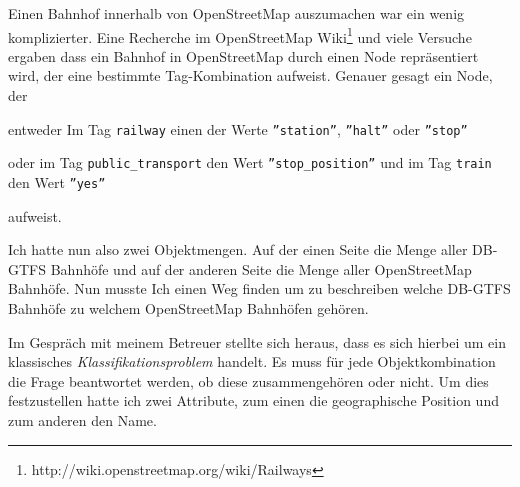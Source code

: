Einen Bahnhof innerhalb von OpenStreetMap auszumachen war ein wenig komplizierter.
Eine Recherche im OpenStreetMap Wiki\footnote{http://wiki.openstreetmap.org/wiki/Railways} und viele Versuche ergaben dass ein Bahnhof in OpenStreetMap durch einen Node repräsentiert wird, der eine bestimmte Tag-Kombination aufweist.
Genauer gesagt ein Node, der 
\begin{compactitem}
  \item entweder Im Tag \texttt{railway} einen der Werte \texttt{''station''}, \texttt{''halt''} oder \texttt{''stop''}
  \item oder im Tag \texttt{public\_transport} den Wert \texttt{''stop\_position''} und im Tag \texttt{train} den Wert \texttt{''yes''}
\end{compactitem}
aufweist. 

Ich hatte nun also zwei Objektmengen.
Auf der einen Seite die Menge aller DB-GTFS Bahnhöfe und auf der anderen Seite die Menge aller OpenStreetMap Bahnhöfe.
Nun musste Ich einen Weg finden um zu beschreiben welche DB-GTFS Bahnhöfe zu welchem OpenStreetMap Bahnhöfen gehören.

Im Gespräch mit meinem Betreuer stellte sich heraus, dass es sich hierbei um ein klassisches \textit{Klassifikationsproblem} handelt.
Es muss für jede Objektkombination die Frage beantwortet werden, ob diese zusammengehören oder nicht.
Um dies festzustellen hatte ich zwei Attribute, zum einen die geographische Position und zum anderen den Name.

